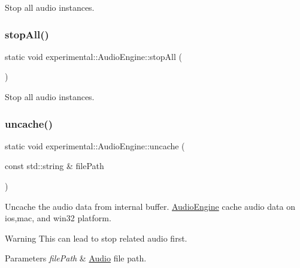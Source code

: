 Stop all audio instances. \mbox{\label{classexperimental_1_1AudioEngine_a911b9b9c56cf769fd561334870533d13}} 
\subsubsection{\texorpdfstring{stop\+All()}{stopAll()}\hspace{0.1cm}{\footnotesize\ttfamily [2/2]}}
{\footnotesize\ttfamily static void experimental\+::\+Audio\+Engine\+::stop\+All (\begin{DoxyParamCaption}{ }\end{DoxyParamCaption})\hspace{0.3cm}{\ttfamily [static]}}

Stop all audio instances. \mbox{\label{classexperimental_1_1AudioEngine_ad4845a8b7855fc7f40058c86069f2a80}} 
\subsubsection{\texorpdfstring{uncache()}{uncache()}\hspace{0.1cm}{\footnotesize\ttfamily [1/2]}}
{\footnotesize\ttfamily static void experimental\+::\+Audio\+Engine\+::uncache (\begin{DoxyParamCaption}\item[{const std\+::string \&}]{file\+Path }\end{DoxyParamCaption})\hspace{0.3cm}{\ttfamily [static]}}

Uncache the audio data from internal buffer. \hyperlink{classexperimental_1_1AudioEngine}{Audio\+Engine} cache audio data on ios,mac, and win32 platform.

\begin{DoxyWarning}{Warning}
This can lead to stop related audio first. 
\end{DoxyWarning}

\begin{DoxyParams}{Parameters}
{\em file\+Path} & \hyperlink{classAudio}{Audio} file path. \\
\hline
\end{DoxyParams}
\mbox{\label{classexperimental_1_1AudioEngine_ad4845a8b7855fc7f40058c86069f2a80}} 
